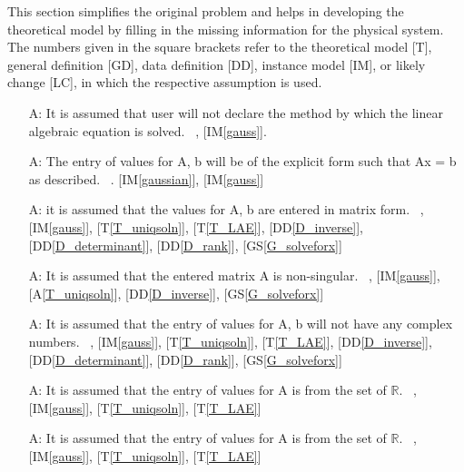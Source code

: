 \documentclass[12pt]{article}
\newcommand{\ddref}[1]{DD\ref{#1}}
\newcommand{\tref}[1]{T\ref{#1}}
\newcounter{assumpnum} %
\newcommand{\aref}[1]{A\ref{#1}}
\newcommand{\gsref}[1]{GS\ref{#1}}
\newcommand{\iref}[1]{IM\ref{#1}}
\begin{document}
This section simplifies the original problem and helps in developing the
theoretical model by filling in the missing information for the physical
system. The numbers given in the square brackets refer to the theoretical model
[T], general definition [GD], data definition [DD], instance model [IM], or
likely change [LC], in which the respective assumption is used.

\begin{itemize}

\item[A\refstepcounter{assumpnum}\theassumpnum \label{A_programcall}:]
It is assumed that user will not declare the method by which the linear algebraic equation is solved.
~\newline
 [\iref{gaussian}], [\iref{gauss}].

\item[A\refstepcounter{assumpnum}\theassumpnum \label{A_explicit}:]
The entry of values for A, b will be of the explicit form such that Ax = b as described.
~\newline
 [\tref{T_LAE}]. [\iref{gaussian}], [\iref{gauss}]

\item[A\refstepcounter{assumpnum}\theassumpnum \label{A_matrixform}:]
it is assumed that the values for A, b are entered in matrix form.
~\newline
 [\iref{gaussian}], [\iref{gauss}], [\tref{T_uniqsoln}], [\tref{T_LAE}], [\ddref{D_inverse}], [\ddref{D_determinant}], [\ddref{D_rank}], [\gsref{G_solveforx}]

\item[A\refstepcounter{assumpnum}\theassumpnum \label{A_unique}:]
It is assumed that the entered matrix A is non-singular. 
~\newline
[\iref{gaussian}], [\iref{gauss}], [\aref{T_uniqsoln}], [\ddref{D_inverse}], [\gsref{G_solveforx}]

\item[A\refstepcounter{assumpnum}\theassumpnum \label{A_complex}:]
It is assumed that the entry of values for A, b will not have any complex numbers.
~\newline
 [\iref{gaussian}], [\iref{gauss}], [\tref{T_uniqsoln}], [\tref{T_LAE}], [\ddref{D_inverse}], [\ddref{D_determinant}], [\ddref{D_rank}], [\gsref{G_solveforx}]

\item[A\refstepcounter{assumpnum}\theassumpnum \label{A_entryofA}:]
It is assumed that the entry of values for A is from the set of $\mathbb{R}$.
~\newline
 [\iref{gaussian}], [\iref{gauss}], [\tref{T_uniqsoln}], [\tref{T_LAE}]

\item[A\refstepcounter{assumpnum}\theassumpnum \label{A_entryofb}:]
It is assumed that the entry of values for A is from the set of $\mathbb{R}$.
~\newline
 [\iref{gaussian}], [\iref{gauss}], [\tref{T_uniqsoln}], [\tref{T_LAE}]




\end{itemize}
\end{document}
